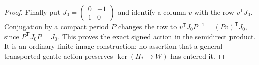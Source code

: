 \begin{proof}
Finally put
$J_0=\left(\begin{smallmatrix}0&-1\\1&0\end{smallmatrix}\right)$
and identify a column $v$ with the row $v^{\mathsf T}J_0$.
Conjugation by a compact period $P$ changes the row to
$v^{\mathsf T}J_0P^{-1}=(Pv)^{\mathsf T}J_0$, since
$P^{\mathsf T}J_0P=J_0$.  This proves the exact signed
action in the semidirect product.  It is an ordinary
finite image construction; no assertion that a general
transported gentle action preserves $\ker(\Pi_*\to W)$
has entered it.
\end{proof}
